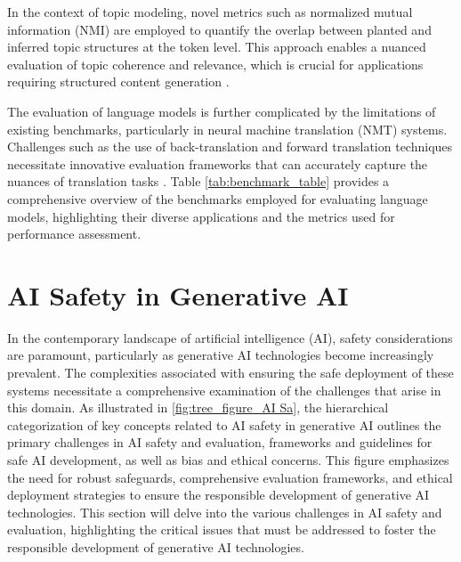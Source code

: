 In the context of topic modeling, novel metrics such as normalized mutual information (NMI) are employed to quantify the overlap between planted and inferred topic structures at the token level. This approach enables a nuanced evaluation of topic coherence and relevance, which is crucial for applications requiring structured content generation \cite{shi2019newevaluationframeworktopic}.

The evaluation of language models is further complicated by the limitations of existing benchmarks, particularly in neural machine translation (NMT) systems. Challenges such as the use of back-translation and forward translation techniques necessitate innovative evaluation frameworks that can accurately capture the nuances of translation tasks \cite{bogoychev2020domaintranslationesenoisesynthetic}. Table \ref{tab:benchmark_table} provides a comprehensive overview of the benchmarks employed for evaluating language models, highlighting their diverse applications and the metrics used for performance assessment.















\section{AI Safety in Generative AI} \label{sec:AI Safety in Generative AI}


In the contemporary landscape of artificial intelligence (AI), safety considerations are paramount, particularly as generative AI technologies become increasingly prevalent. The complexities associated with ensuring the safe deployment of these systems necessitate a comprehensive examination of the challenges that arise in this domain. As illustrated in \autoref{fig:tree_figure_AI Sa}, the hierarchical categorization of key concepts related to AI safety in generative AI outlines the primary challenges in AI safety and evaluation, frameworks and guidelines for safe AI development, as well as bias and ethical concerns. This figure emphasizes the need for robust safeguards, comprehensive evaluation frameworks, and ethical deployment strategies to ensure the responsible development of generative AI technologies. This section will delve into the various challenges in AI safety and evaluation, highlighting the critical issues that must be addressed to foster the responsible development of generative AI technologies.

